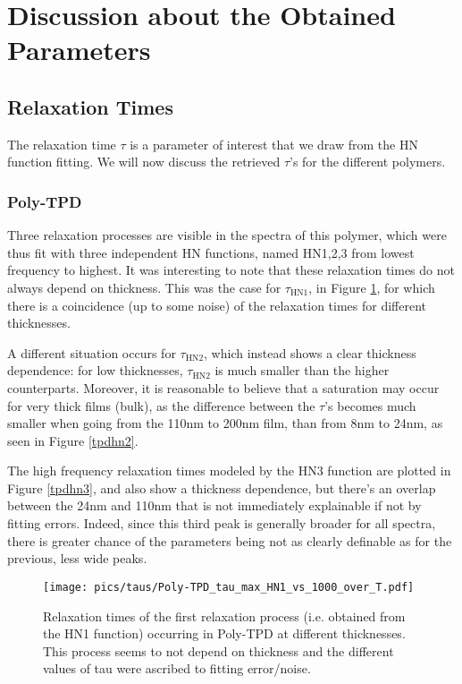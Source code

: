 \section{Discussion about the Obtained Parameters}
\subsection{Relaxation Times}
The relaxation time $\tau$ is a parameter of interest that we draw from the HN function fitting. We will now discuss the retrieved $\tau$'s for the different polymers.
\subsubsection{Poly-TPD}
Three relaxation processes are visible in the spectra of this polymer, which were thus fit with three independent HN functions, named HN1,2,3 from lowest frequency to highest. It was interesting to note that these relaxation times do not always depend on thickness.
This was the case for $\tau_{\text{HN1}}$, in Figure \ref{tpdhn1}, for which there is a coincidence (up to some noise) of the relaxation times for different thicknesses.

A different situation occurs for $\tau_{\text{HN2}}$, which instead shows a clear thickness dependence: for low thicknesses, $\tau_{\text{HN2}}$ is much smaller than the higher counterparts. Moreover, it is reasonable to believe that a saturation may occur for very thick films (bulk), as the difference between the $\tau$'s becomes much smaller when going from the 110nm to 200nm film, than from 8nm to 24nm, as seen in Figure \ref{tpdhn2}.

The high frequency relaxation times modeled by the HN3 function are plotted in Figure \ref{tpdhn3}, and also show a thickness dependence, but there's an overlap between the 24nm and 110nm that is not immediately explainable if not by fitting errors. Indeed, since this third peak is generally broader for all spectra, there is greater chance of the parameters being not as clearly definable as for the previous, less wide peaks.

\begin{figure}[t]%
  \centering
  \texttt{[image: pics/taus/Poly-TPD\_tau\_max\_HN1\_vs\_1000\_over\_T.pdf]}
  \caption{Relaxation times of the first relaxation process (i.e. obtained from the HN1 function) occurring in Poly-TPD at different thicknesses. This process seems to not depend on thickness and the different values of tau were ascribed to fitting error/noise.}
  \label{tpdhn1}
\end{figure}%


